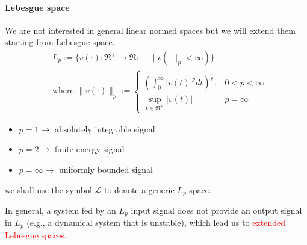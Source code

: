 \paragraph{Lebesgue space}
We are not interested in general linear normed spaces but we will extend them starting from Lebesgue space.
\[
\begin{aligned}
	&L_p:=\{v(\cdot):\Re^+\to\Re:\quad \|v(\cdot\|_p<\infty)\}\\
	&\text{where } \|v(\cdot)\|_p:=\begin{cases}
	\left(\int_{0}^{\infty}|v(t)|^pdt\right)^{\frac{1}{p}},& 0<p<\infty\\
	\sup_{t\in\Re^+}|v(t)|&p=\infty
	\end{cases}
\end{aligned}
\]
\begin{itemize}
	\item $p=1 \to$ absolutely integrable signal
	\item $p=2 \to$ finite energy signal
	\item $p=\infty	\to$  uniformly bounded signal
\end{itemize}
\begin{note}
	we shall use the symbol $\mathcal{L}$ to denote a generic $L_p$ space.
\end{note}








In general, a system fed by an $L_p$ input signal does not provide an output signal in $L_p$ (e.g., a dynamical system that is unstable), which lead us to \textcolor{red}{extended Lebesgue spaces}.
